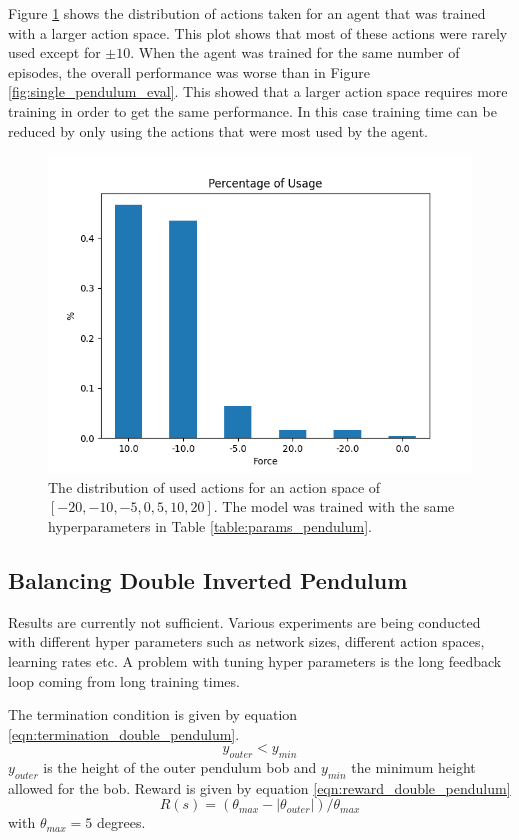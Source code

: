 \documentclass{LTHtwocol} %
\begin{document}
Figure \ref{fig:pendulum_force} shows the distribution of actions taken for an agent that was trained with a larger action space. This plot shows that most of these actions were rarely used except for $\pm 10$. When the agent was trained for the same number of episodes, the overall performance was worse than in Figure \ref{fig:single_pendulum_eval}. This showed that a larger action space requires more training in order to get the same performance. In this case training time can be reduced by only using the actions that were most used by the agent.
\begin{figure}[H]
	\centering
	\includegraphics[width=0.9\columnwidth]{figures/Pendulum_force.png}
	\caption{The distribution of used actions for an action space of $[-20,-10,-5,0,5,10,20]$. The model was trained with the same hyperparameters in Table \ref{table:params_pendulum}.}
	\label{fig:pendulum_force}
\end{figure}



\subsection{Balancing Double Inverted Pendulum}
Results are currently not sufficient.
Various experiments are being conducted with different hyper parameters such as network sizes, different action spaces, learning rates etc.
A problem with tuning hyper parameters is the long feedback loop coming from long training times.

The termination condition is given by equation \eqref{eqn:termination_double_pendulum}.
\begin{equation}
	\label{eqn:termination_double_pendulum}
	y_{outer} < y_{min}
\end{equation}
$y_{outer}$ is the height of the outer pendulum bob and $y_{min}$ the minimum height allowed for the bob.
Reward is given by equation \eqref{eqn:reward_double_pendulum}
\begin{equation}
	\label{eqn:reward_double_pendulum}
	R(s) = (\theta_{max} - |\theta_{outer}|) / \theta_{max}
\end{equation}
with $\theta_{max} = 5$ degrees.
\end{document}
